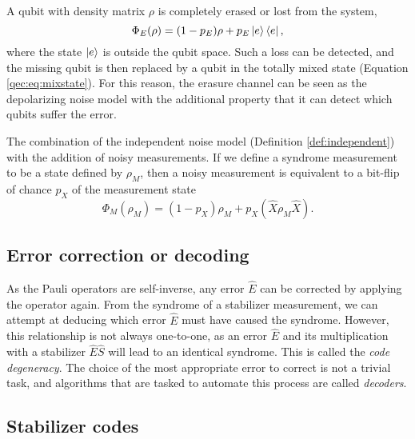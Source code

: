 \begin{definition}\label{def:erasurenoise}
  A qubit with density matrix $\rho$ is completely erased or lost from the system,
  \begin{equation}\label{qec:eq:erasure}
    \Phi_E(\rho) = (1-p_E)\rho + p_E\ket{e}\bra{e},
  \end{equation}
  where the state $\ket{e}$ is outside the qubit space. Such a loss can be detected, and the missing qubit is then replaced by a qubit in the totally mixed state (Equation \eqref{qec:eq:mixstate}). For this reason, the erasure channel can be seen as the depolarizing noise model with the additional property that it can detect which qubits suffer the error.
\end{definition}

\begin{definition}\label{def:pheno}
 The combination of the independent noise model (Definition \ref{def:independent}) with the addition of noisy measurements. If we define a syndrome measurement to be a state defined by $\rho_M$, then a noisy measurement is equivalent to a bit-flip of chance $p_X$ of the measurement state
  \begin{equation}\label{eq:pheno}
    \Phi_M(\rho_M)=  (1-p_X)\rho_M + p_X(\hat{X}\rho_M \hat{X}).
  \end{equation}
\end{definition}


\subsection{Error correction or decoding}

As the Pauli operators are self-inverse, any error $\hat{E}$ can be corrected by applying the operator again. From the syndrome of a stabilizer measurement, we can attempt at deducing which error $\hat{E}$ must have caused the syndrome. However, this relationship is not always one-to-one, as an error $\hat{E}$ and its multiplication with a stabilizer $\hat{E}\hat{S}$ will lead to an identical syndrome. This is called the \emph{code degeneracy}. The choice of the most appropriate error to correct is not a trivial task, and algorithms that are tasked to automate this process are called \emph{decoders}.

\subsection{Stabilizer codes}

